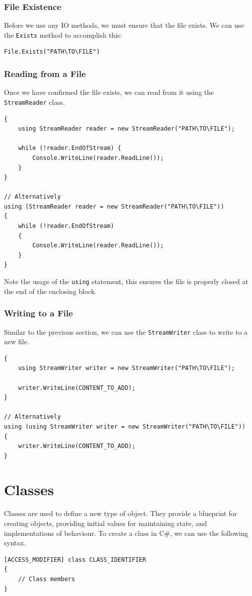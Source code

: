 \documentclass{article}
\begin{document}
\subsubsection{File Existence}
Before we use any IO methods, we must ensure that the file exists. We
can use the \texttt{Exists} method to accomplish this:
\begin{verbatim}
File.Exists("PATH\TO\FILE")
\end{verbatim}
\subsubsection{Reading from a File}
Once we have confirmed the file exists, we can read from it using the
\texttt{StreamReader} class.
\begin{verbatim}
{
    using StreamReader reader = new StreamReader("PATH\TO\FILE");

    while (!reader.EndOfStream) {
        Console.WriteLine(reader.ReadLine());
    }
}

// Alternatively
using (StreamReader reader = new StreamReader("PATH\TO\FILE"))
{
    while (!reader.EndOfStream)
    {
        Console.WriteLine(reader.ReadLine());
    }
}
\end{verbatim}
Note the usage of the \texttt{using} statement, this
ensures the file is properly closed at the end of the enclosing block.
\subsubsection{Writing to a File}
Similar to the previous section, we can use the
\texttt{StreamWriter} class to write to a new file.
\begin{verbatim}
{
    using StreamWriter writer = new StreamWriter("PATH\TO\FILE");

    writer.WriteLine(CONTENT_TO_ADD);
}

// Alternatively
using (using StreamWriter writer = new StreamWriter("PATH\TO\FILE"))
{
    writer.WriteLine(CONTENT_TO_ADD);
}
\end{verbatim}
\section{Classes}
Classes are used to define a new type of object. They provide a
blueprint for creating objects, providing initial values for
maintaining state, and implementations of behaviour. To create a class
in C\#, we can use the following syntax.
\begin{verbatim}
[ACCESS_MODIFIER] class CLASS_IDENTIFIER
{
    // Class members
}
\end{verbatim}
\end{document}
